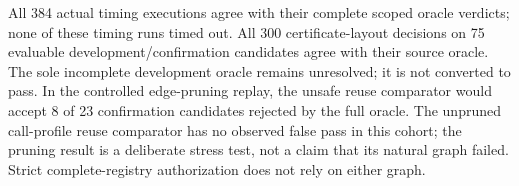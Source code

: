 All 384 actual timing executions agree with their complete scoped oracle verdicts; none of these timing runs timed out. All 300 certificate-layout decisions on 75 evaluable development/confirmation candidates agree with their source oracle. The sole incomplete development oracle remains unresolved; it is not converted to pass. In the controlled edge-pruning replay, the unsafe reuse comparator would accept 8 of 23 confirmation candidates rejected by the full oracle. The unpruned call-profile reuse comparator has no observed false pass in this cohort; the pruning result is a deliberate stress test, not a claim that its natural graph failed. Strict complete-registry authorization does not rely on either graph.

